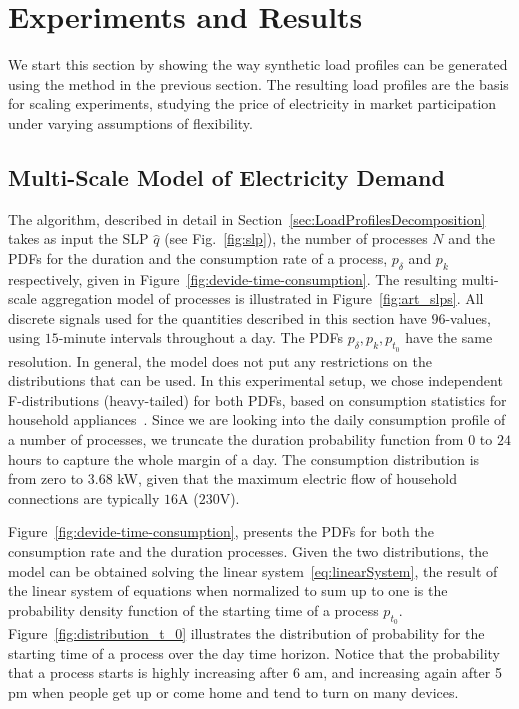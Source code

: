 \documentclass[conference]{IEEEtran}
\begin{document}
\section{Experiments and Results}
\label{sec:Experiments}
We start this section by showing the way synthetic load profiles can be generated using the method in the previous section. The resulting load profiles are the basis for scaling experiments, studying the price of electricity in market participation under varying assumptions of flexibility.




\subsection{Multi-Scale Model of Electricity Demand}
\label{sec:Results_Synthetic}

The algorithm, described in detail in Section~\ref{sec:LoadProfilesDecomposition} takes as input the SLP $\hat{q}$ (see Fig.~\ref{fig:slp}), the number of processes $N$ and the PDFs for the duration and the consumption rate of a process, $p_{\delta} $ and $p_k$ respectively, given in Figure~\ref{fig:devide-time-consumption}. The resulting multi-scale aggregation model of processes is illustrated in Figure~\ref{fig:art_slps}.
All discrete signals used for the quantities described in this section have $96$-values, using $15$-minute intervals throughout a day. The PDFs $p_{\delta}, p_k, p_{t_0}$ have the same resolution. In general, the model does not put any restrictions on the distributions that can be used. In this experimental setup, we chose independent F-distributions (heavy-tailed) for both PDFs, based on consumption statistics for household appliances~\cite{zimmermann2012household}.
Since we are looking into the daily consumption profile of a number of processes, we truncate the duration probability function from $0$ to $24$ hours to capture the whole margin of a day. The consumption distribution is from zero to $3.68$ kW, given that the maximum electric flow of household connections are typically $16$A ($230$V).

Figure~\ref{fig:devide-time-consumption}, presents the PDFs for both the consumption rate and the duration processes. Given the two distributions, the model can be obtained solving the linear system~\eqref{eq:linearSystem}, the result of the linear system of equations when normalized to sum up to one is the probability density function of the starting time of a process $p_{t_0}$. Figure~\ref{fig:distribution_t_0} illustrates the distribution of probability for the starting time of a process over the day time horizon. Notice that the probability that a process starts is highly increasing after 6 am, and increasing again after 5 pm when people get up or come home and tend to turn on many devices.
\end{document}
